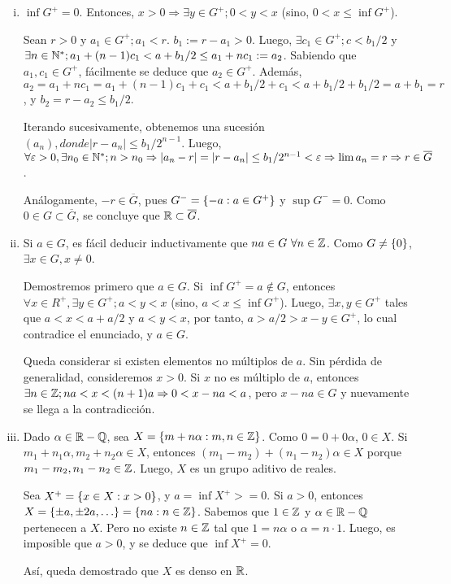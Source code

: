 
\hfill

\begin{enumerate}[i)]

	\item $\inf G^+ = 0$. Entonces, $x>0 \Rightarrow \exists y\in G^+; 0<y<x$ (sino, $0<x\leq \inf G^+$).

		Sean $r>0$ y $a_1\in G^+; a_1<r$. $b_1:=r-a_1>0$. Luego, $\exists c_1\in G^+; c<b_1/2$ y $\exists n\in\mathbb{N}^*; a_1+(n-1)c_1 < a+b_1/2 \leq a_1+nc_1 := a_2$. Sabiendo que $a_1,c_1\in G^+$, fácilmente se deduce que $a_2\in G^+$. Además, $a_2 = a_1+nc_1 = a_1+(n-1)c_1 + c_1 < a + b_1/2 + c_1 < a + b_1/2 + b_1/2 = a + b_1 = r$, y $b_2=r-a_2\leq b_1/2$.

		Iterando sucesivamente, obtenemos una sucesión $(a_n), donde |r-a_n| \leq b_1/2^{n-1}$.
		Luego, $\forall\varepsilon > 0, \exists n_0\in\mathbb{N}^*; n > n_0 \Rightarrow |a_n-r| = |r-a_n| \leq b_1/2^{n-1} < \varepsilon \Rightarrow \lim a_n = r \Rightarrow r\in\overline{G}$.

		Análogamente, $-r\in\overline{G}$, pues $G^-=\left\{-a:a\in G^+\right\}$ y $\sup G^-=0$. Como $0\in G\subset \overline{G}$, se concluye que $\mathbb{R}\subset\overline{G}$.

	\item Si $a\in G$, es fácil deducir inductivamente que $na\in G\ \forall n\in\Z$. Como $G\neq\left\{0\right\}$, $\exists x\in G,x\neq 0$.

		Demostremos primero que $a\in G$. Si $\inf G^+ = a \notin G$, entonces $\forall x\in R^+, \exists y \in G^+; a < y < x$ (sino, $a < x \leq \inf G^+$).
		Luego, $\exists x,y\in G^+$ tales que $a < x < a + a/2$ y $a < y < x$, por tanto, $a > a/2 > x-y \in G^+$, lo cual contradice el enunciado, y $a\in G$.

		Queda considerar si existen elementos no múltiplos de $a$.
		Sin pérdida de generalidad, consideremos $x>0$. Si $x$ no es múltiplo de $a$, entonces $\exists n\in\mathbb{Z}; na < x < (n+1)a \Rightarrow 0 < x-na < a$, pero $x-na\in G$ y nuevamente se llega a la contradicción.

	\item Dado $\alpha\in\mathbb{R}-\mathbb{Q}$, sea $X = \left\{m+n\alpha:m,n\in\mathbb{Z}\right\}$.
		Como $0 = 0+0\alpha$, $0\in X$.
		Si $m_1+n_1\alpha,m_2+n_2\alpha\in X$, entonces $(m_1-m_2)+(n_1-n_2)\alpha\in X$ porque $m_1-m_2,n_1-n_2\in\mathbb{Z}$.
		Luego, $X$ es un grupo aditivo de reales.

		Sea $X^+ = \left\{x\in X: x>0\right\}$, y $a = \inf X^+ >= 0$. Si $a>0$, entonces $X = \left\{\pm a, \pm 2a, \ldots\right\} = \left\{na:n\in\mathbb{Z}\right\}$. Sabemos que $1\in\mathbb{Z}$ y $\alpha\in\mathbb{R}-\mathbb{Q}$ pertenecen a $X$. Pero no existe $n\in\mathbb{Z}$ tal que $1=n\alpha$ o $\alpha = n\cdot 1$. Luego, es imposible que $a>0$, y se deduce que $\inf X^+ = 0$.

		Así, queda demostrado que $X$ es denso en $\mathbb{R}$.

\end{enumerate}